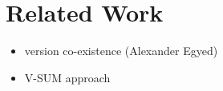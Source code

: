 \section{Related Work}
\label{sec:RW}

\begin{itemize}
    \item \metamodel version co-existence (Alexander Egyed)
    \item V-SUM approach
\end{itemize}

